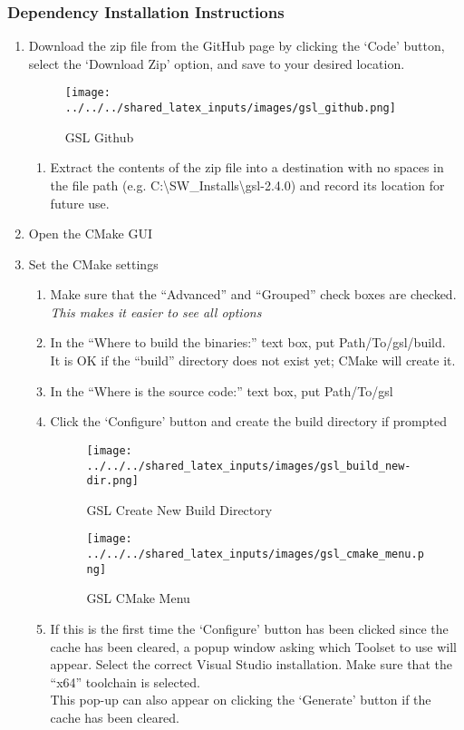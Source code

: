 \subsubsection{Dependency Installation Instructions}
\begin{enumerate}
	\item Download the zip file from the GitHub page by clicking the ‘Code’ button, select the ‘Download Zip’ option, and save to your desired location.
	\begin{figure}[H]
		\centering
		\texttt{[image: ../../../shared\_latex\_inputs/images/gsl\_github.png]}
		\caption{GSL Github}
	\end{figure}
	\begin{enumerate}
		\item Extract the contents of the zip file into a destination with no spaces in the file path (e.g. C:\textbackslash SW\_Installs\textbackslash gsl-2.4.0) and record its location for future use.
	\end{enumerate}
	\item Open the CMake \ac{GUI}
	\item Set the CMake settings
	\begin{enumerate}
		\item Make sure that the “Advanced” and “Grouped” check boxes are checked. \\ \emph{This makes it easier to see all options}
		\item In the “Where to build the binaries:” text box, put Path/To/gsl/build. \\ It is OK if the “build” directory does not exist yet; CMake will create it. 
		\item In the “Where is the source code:” text box, put Path/To/gsl
		\item Click the ‘Configure’ button and create the build directory if prompted 
			\begin{figure}[H]
				\centering
				\texttt{[image: ../../../shared\_latex\_inputs/images/gsl\_build\_new-dir.png]}
				\caption{GSL Create New Build Directory}
			\end{figure}
			\begin{figure}[H]
				\centering
				\texttt{[image: ../../../shared\_latex\_inputs/images/gsl\_cmake\_menu.png]}
				\caption{GSL CMake Menu}
			\end{figure}
		\item If this is the first time the ‘Configure’ button has been clicked since the cache has been cleared, a popup window asking which Toolset to use will appear. Select the correct Visual Studio installation. Make sure that the “x64” toolchain is selected. \\ This pop-up can also appear on clicking the ‘Generate’ button if the cache has been cleared.

\end{enumerate}
\end{enumerate}
